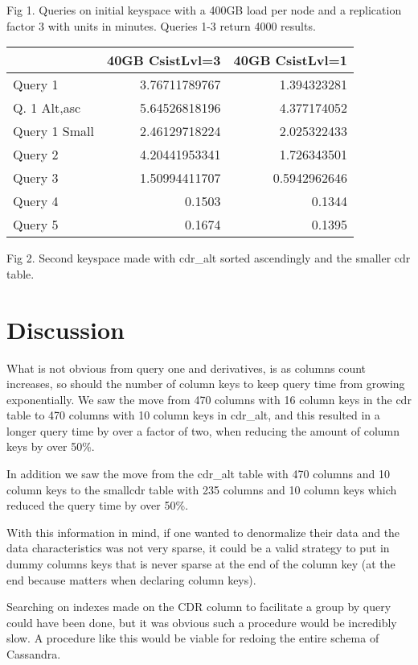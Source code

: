 \documentclass[letterpaper]{article}
\begin{document}
Fig 1. Queries on initial keyspace with a 400GB load per node and a replication factor 3 with units in minutes. Queries 1-3 return 4000 results.
\\

\begin{tabular}[h]{|l|r|r|}
\hline
& 40GB CsistLvl=3 & 40GB CsistLvl=1 \\ \hline
Query 1       & 3.76711789767 & 1.394323281 \\
Q. 1 Alt,asc    & 5.64526818196 & 4.377174052 \\
Query 1 Small  & 2.46129718224 & 2.025322433 \\
Query 2        & 4.20441953341 & 1.726343501 \\
Query 3        & 1.50994411707 & 0.5942962646 \\
Query 4       & 0.1503 & 0.1344 \\
Query 5       & 0.1674 & 0.1395 \\
\hline
\end{tabular}

Fig 2. Second keyspace made with cdr\_alt sorted ascendingly and the smaller cdr table.

\section{Discussion}

What is not obvious from query one and derivatives, is as columns count increases, so should the number 
of column keys to keep query time from growing exponentially.
We saw the move from 470 columns with 16 column keys in the cdr table to 470 columns with 10 column
keys in cdr\_alt, and this resulted in a
longer query time by over a factor of two, when reducing the amount of column keys by over 50\%.

In addition we saw the move from the cdr\_alt table with 470 columns and 10 column keys to the smallcdr table with 235 columns and 10 column keys which
reduced the query time by over 50\%. 

With this information in mind, if one wanted to denormalize their data and the data characteristics was
not very sparse, it could be a valid strategy to put in dummy columns keys that is never sparse at the
end of the column key (at the end because matters when declaring column keys).

Searching on indexes made on the CDR column to facilitate a group by query could have been done, but
it was obvious such a procedure would be incredibly slow. A procedure like this would be viable for 
redoing the entire schema of Cassandra.
\end{document}
